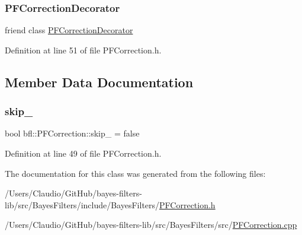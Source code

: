 \subsubsection{\texorpdfstring{P\+F\+Correction\+Decorator}{PFCorrectionDecorator}}
{\footnotesize\ttfamily friend class \mbox{\hyperlink{classbfl_1_1PFCorrectionDecorator}{P\+F\+Correction\+Decorator}}\hspace{0.3cm}{\ttfamily [friend]}}



Definition at line 51 of file P\+F\+Correction.\+h.



\subsection{Member Data Documentation}
\mbox{\label{classbfl_1_1PFCorrection_aac7b1063a3207bd00547ad5490bbc935}} 
\subsubsection{\texorpdfstring{skip\+\_\+}{skip\_}}
{\footnotesize\ttfamily bool bfl\+::\+P\+F\+Correction\+::skip\+\_\+ = false\hspace{0.3cm}{\ttfamily [private]}}



Definition at line 49 of file P\+F\+Correction.\+h.



The documentation for this class was generated from the following files\+:\begin{DoxyCompactItemize}
\item 
/\+Users/\+Claudio/\+Git\+Hub/bayes-\/filters-\/lib/src/\+Bayes\+Filters/include/\+Bayes\+Filters/\mbox{\hyperlink{PFCorrection_8h}{P\+F\+Correction.\+h}}\item 
/\+Users/\+Claudio/\+Git\+Hub/bayes-\/filters-\/lib/src/\+Bayes\+Filters/src/\mbox{\hyperlink{PFCorrection_8cpp}{P\+F\+Correction.\+cpp}}\end{DoxyCompactItemize}
